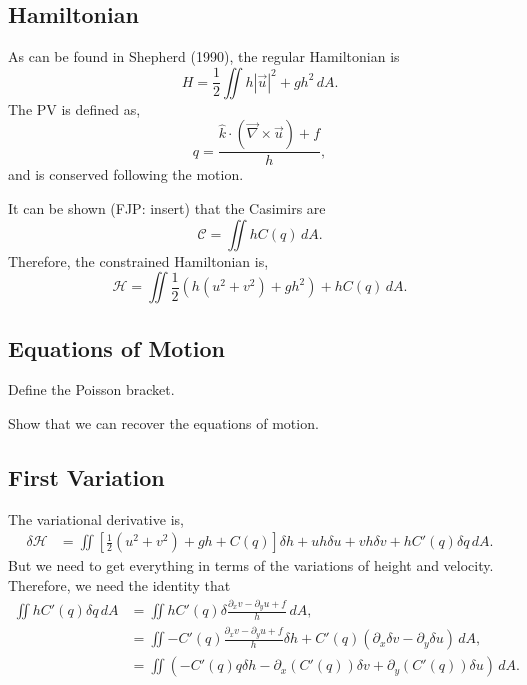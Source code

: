 \documentclass[12pt]{article}
\begin{document}
  \subsection{Hamiltonian}
    As can be found in Shepherd (1990), the regular Hamiltonian is 
    $$
    H = \frac12 \iint h | \vec u |^2 + g h^2 \, dA.
    $$
    The PV is defined as,
    $$
    q = \frac{ \hat k \cdot (\vec \nabla \times \vec u) + f}{h},
    $$
    and is conserved following the motion.  

    It can be shown (FJP: insert) that the Casimirs are
    $$
    \mathcal{C} = \iint hC(q) \, dA.
    $$
    Therefore, the constrained Hamiltonian is,
    $$
    \mathcal{H} =  \iint \frac12  \left( h (u^2 + v^2) + g h^2 \right) + h C(q) \, dA.
    $$

  \subsection{Equations of Motion}
    Define the Poisson bracket.

    Show that we can recover the equations of motion.

  \subsection{First Variation}
    The variational derivative is,
    \begin{align*}
      \delta \mathcal{H} 
      & =  \iint \left[ \frac12  (u^2 + v^2) + g h  + C(q) \right] \delta h   +  uh  \delta u + vh \delta v   + h C'(q) \delta q \, dA.
    \end{align*}
    But we need to get everything in terms of the variations of height and velocity.  Therefore, we need the identity that
    \begin{align*}
      \iint h C'(q) \delta q \, dA 
      &= \iint h C'(q) \delta \frac{ \partial_x v - \partial_y u+ f}{h} \, dA, \\
      &= \iint - C'(q) \frac{ \partial_x v - \partial_y u+ f}{h } \delta h + C'(q) \left(  \partial_x \delta v - \partial_y \delta u \right) \, dA, \\
      &= \iint \left( - C'(q) q \delta h - \partial_x ( C'(q) )  \delta v + \partial_y ( C'(q) ) \delta u \right) \, dA.
    \end{align*}
\end{document}
